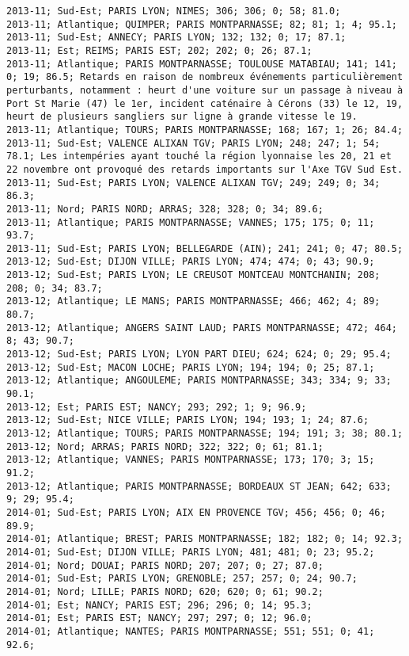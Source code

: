 \documentclass{article}
\begin{document}
\begin{Verbatim}[commandchars=\\\{\}]
2013-11; Sud-Est; PARIS LYON; NIMES; 306; 306; 0; 58; 81.0; 
2013-11; Atlantique; QUIMPER; PARIS MONTPARNASSE; 82; 81; 1; 4; 95.1; 
2013-11; Sud-Est; ANNECY; PARIS LYON; 132; 132; 0; 17; 87.1; 
2013-11; Est; REIMS; PARIS EST; 202; 202; 0; 26; 87.1; 
2013-11; Atlantique; PARIS MONTPARNASSE; TOULOUSE MATABIAU; 141; 141; 0; 19; 86.5; Retards en raison de nombreux événements particulièrement perturbants, notamment : heurt d'une voiture sur un passage à niveau à Port St Marie (47) le 1er, incident caténaire à Cérons (33) le 12, 19, heurt de plusieurs sangliers sur ligne à grande vitesse le 19.
2013-11; Atlantique; TOURS; PARIS MONTPARNASSE; 168; 167; 1; 26; 84.4; 
2013-11; Sud-Est; VALENCE ALIXAN TGV; PARIS LYON; 248; 247; 1; 54; 78.1; Les intempéries ayant touché la région lyonnaise les 20, 21 et 22 novembre ont provoqué des retards importants sur l'Axe TGV Sud Est.
2013-11; Sud-Est; PARIS LYON; VALENCE ALIXAN TGV; 249; 249; 0; 34; 86.3; 
2013-11; Nord; PARIS NORD; ARRAS; 328; 328; 0; 34; 89.6; 
2013-11; Atlantique; PARIS MONTPARNASSE; VANNES; 175; 175; 0; 11; 93.7; 
2013-11; Sud-Est; PARIS LYON; BELLEGARDE (AIN); 241; 241; 0; 47; 80.5; 
2013-12; Sud-Est; DIJON VILLE; PARIS LYON; 474; 474; 0; 43; 90.9; 
2013-12; Sud-Est; PARIS LYON; LE CREUSOT MONTCEAU MONTCHANIN; 208; 208; 0; 34; 83.7; 
2013-12; Atlantique; LE MANS; PARIS MONTPARNASSE; 466; 462; 4; 89; 80.7; 
2013-12; Atlantique; ANGERS SAINT LAUD; PARIS MONTPARNASSE; 472; 464; 8; 43; 90.7; 
2013-12; Sud-Est; PARIS LYON; LYON PART DIEU; 624; 624; 0; 29; 95.4; 
2013-12; Sud-Est; MACON LOCHE; PARIS LYON; 194; 194; 0; 25; 87.1; 
2013-12; Atlantique; ANGOULEME; PARIS MONTPARNASSE; 343; 334; 9; 33; 90.1; 
2013-12; Est; PARIS EST; NANCY; 293; 292; 1; 9; 96.9; 
2013-12; Sud-Est; NICE VILLE; PARIS LYON; 194; 193; 1; 24; 87.6; 
2013-12; Atlantique; TOURS; PARIS MONTPARNASSE; 194; 191; 3; 38; 80.1; 
2013-12; Nord; ARRAS; PARIS NORD; 322; 322; 0; 61; 81.1; 
2013-12; Atlantique; VANNES; PARIS MONTPARNASSE; 173; 170; 3; 15; 91.2; 
2013-12; Atlantique; PARIS MONTPARNASSE; BORDEAUX ST JEAN; 642; 633; 9; 29; 95.4; 
2014-01; Sud-Est; PARIS LYON; AIX EN PROVENCE TGV; 456; 456; 0; 46; 89.9; 
2014-01; Atlantique; BREST; PARIS MONTPARNASSE; 182; 182; 0; 14; 92.3; 
2014-01; Sud-Est; DIJON VILLE; PARIS LYON; 481; 481; 0; 23; 95.2; 
2014-01; Nord; DOUAI; PARIS NORD; 207; 207; 0; 27; 87.0; 
2014-01; Sud-Est; PARIS LYON; GRENOBLE; 257; 257; 0; 24; 90.7; 
2014-01; Nord; LILLE; PARIS NORD; 620; 620; 0; 61; 90.2; 
2014-01; Est; NANCY; PARIS EST; 296; 296; 0; 14; 95.3; 
2014-01; Est; PARIS EST; NANCY; 297; 297; 0; 12; 96.0; 
2014-01; Atlantique; NANTES; PARIS MONTPARNASSE; 551; 551; 0; 41; 92.6; 

\end{Verbatim}
\end{document}
